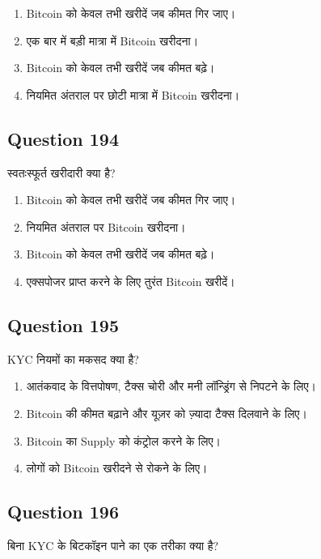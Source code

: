 \documentclass[12pt,a4paper]{article}
\begin{document}
\begin{enumerate}[label=\Alph*., leftmargin=*]
\item Bitcoin को केवल तभी खरीदें जब कीमत गिर जाए।
\item एक बार में बड़ी मात्रा में Bitcoin खरीदना।
\item Bitcoin को केवल तभी खरीदें जब कीमत बढ़े।
\item नियमित अंतराल पर छोटी मात्रा में Bitcoin खरीदना।
\end{enumerate}

\bigskip


\subsection*{Question 194}
स्वतःस्फूर्त खरीदारी क्या है?

\begin{enumerate}[label=\Alph*., leftmargin=*]
\item Bitcoin को केवल तभी खरीदें जब कीमत गिर जाए।
\item नियमित अंतराल पर Bitcoin खरीदना।
\item Bitcoin को केवल तभी खरीदें जब कीमत बढ़े।
\item एक्सपोजर प्राप्त करने के लिए तुरंत Bitcoin खरीदें।
\end{enumerate}

\bigskip


\subsection*{Question 195}
KYC नियमों का मकसद क्या है?

\begin{enumerate}[label=\Alph*., leftmargin=*]
\item आतंकवाद के वित्तपोषण, टैक्स चोरी और मनी लॉन्ड्रिंग से निपटने के लिए।
\item Bitcoin की कीमत बढ़ाने और यूज़र को ज़्यादा टैक्स दिलवाने के लिए।
\item Bitcoin का Supply को कंट्रोल करने के लिए।
\item लोगों को Bitcoin खरीदने से रोकने के लिए।
\end{enumerate}

\bigskip


\subsection*{Question 196}
बिना KYC के बिटकॉइन पाने का एक तरीका क्या है?
\end{document}
